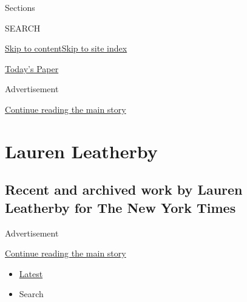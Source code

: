 Sections

SEARCH

\protect\hyperlink{site-content}{Skip to
content}\protect\hyperlink{site-index}{Skip to site index}

\href{https://myaccount.nytimes.com/auth/login?response_type=cookie\&client_id=vi}{}

\href{https://www.nytimes.com/section/todayspaper}{Today's Paper}

Advertisement

\protect\hyperlink{after-top}{Continue reading the main story}

\hypertarget{lauren-leatherby}{%
\section{Lauren Leatherby}\label{lauren-leatherby}}

\hypertarget{recent-and-archived-work-by-lauren-leatherby-for-the-new-york-times}{%
\subsection{Recent and archived work by Lauren Leatherby for The New
York
Times}\label{recent-and-archived-work-by-lauren-leatherby-for-the-new-york-times}}

Advertisement

\protect\hyperlink{after-mid1}{Continue reading the main story}

\begin{itemize}
\tightlist
\item
  \protect\hyperlink{stream-panel}{Latest}
\item
  Search
\end{itemize}

